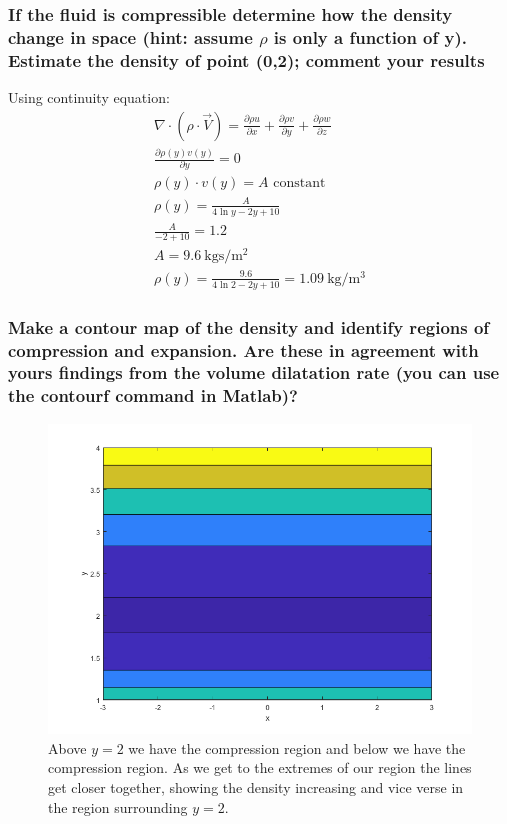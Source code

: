 \documentclass[class=report, crop=false, 12pt,a4paper]{standalone}
\begin{document}
\subsubsection{If the fluid is compressible determine how the density change in space (hint: assume $\rho$ is only a function of y). Estimate the density of point (0,2); comment your results}
Using continuity equation:
\begin{gather}
  \nabla \cdot (\rho \cdot \vec{V}) = \frac{\partial \rho u}{\partial x} + \frac{\partial \rho v}{\partial y} + \frac{\partial \rho w}{\partial z} \\
  \frac{\partial \rho(y) v(y)}{\partial y} = 0\\
  \rho(y)\cdot v(y) = A \textrm{ constant}\\
  \rho(y) = \frac{A}{4\ln{y} - 2y +10}\\
  \frac{A}{-2+10} = 1.2\\
  A = 9.6 \ \si{\kg\second\per\meter\squared}\\
  \rho(y) = \frac{9.6}{4\ln{2} - 2y +10} = 1.09 \ \si{\kg\per\meter\cubed} 
\end{gather}
\subsubsection{Make a contour map of the density and identify regions of compression and expansion. Are these in agreement with yours findings from the volume dilatation rate (you can use the contourf command in Matlab)?}
\begin{figure}[H]
  \centering
  \includegraphics[width = 0.8 \textwidth]{../img/counter.png}
  \caption{Above $y = 2$ we have the compression region and below we have the compression region. As we get to the extremes of our region the lines get closer together, showing the density increasing and vice verse in the region surrounding $y =2$.}
\end{figure}
\end{document}
